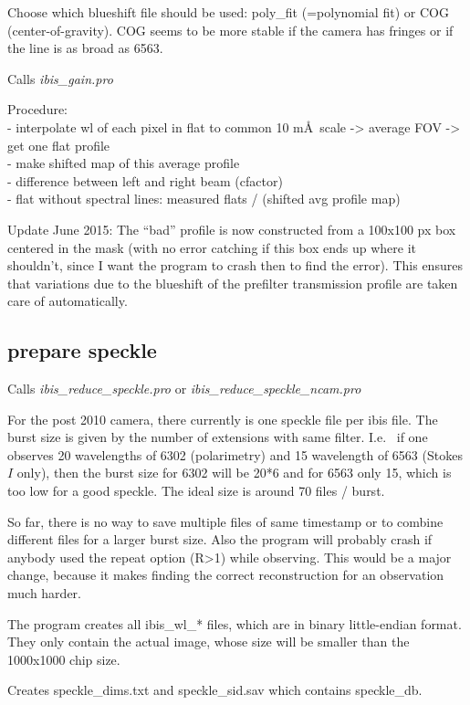 \documentclass[a4paper,12pt]{article}
\begin{document}
Choose which blueshift file should be used: poly\_fit (=polynomial fit) or COG (center-of-gravity). COG seems to be more stable if the camera has fringes or if the line is as broad as 6563.

Calls \textit{ibis\_gain.pro}

Procedure:\\
 - interpolate wl of each pixel in flat to common 10 m\AA\ scale -> average FOV -> get one flat profile\\
 - make shifted map of this average profile\\
-  difference between left and right beam (cfactor)\\
-  flat without spectral lines: measured flats / (shifted avg profile map)


Update June 2015: The ``bad'' profile is now constructed from a 100x100 px box centered in the mask (with no error catching if this box ends up where it shouldn't, since I want the program to crash then to find the error). This ensures that variations due to the blueshift of the prefilter transmission profile are taken care of automatically.

\subsection{prepare speckle}
\label{prepspeckle}
Calls \textit{ibis\_reduce\_speckle.pro} or \textit{ibis\_reduce\_speckle\_ncam.pro} 

For the post 2010 camera, there currently is one speckle file per ibis file. The burst size is given by the number of extensions with same filter. I.e.~ if one observes 20 wavelengths of 6302 (polarimetry) and 15 wavelength of 6563 (Stokes $I$ only), then the burst size for 6302 will be 20*6 and for 6563 only 15, which is too low for a good speckle. The ideal size is around 70 files / burst.

So far, there is no way to save multiple files of same timestamp or to combine different files for a larger burst size. Also the program will probably crash if anybody used the repeat option (R>1) while observing. This would be a major change, because it makes finding the correct reconstruction for an observation much harder.

The program creates all ibis\_wl\_* files, which are in binary little-endian format. They only contain the actual image, whose size will be smaller than the 1000x1000 chip size.

Creates speckle\_dims.txt and speckle\_sid.sav which contains speckle\_db.
\end{document}
